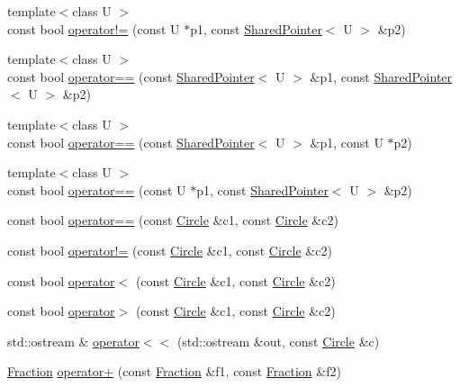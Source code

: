 \begin{DoxyCompactItemize}
\item 
{\footnotesize template$<$class U $>$ }\\const bool \hyperlink{namespaceprism_ab8792dbd5cac5678390843bacdb69daa}{operator!=} (const U $\ast$p1, const \hyperlink{classprism_1_1_shared_pointer}{Shared\+Pointer}$<$ U $>$ \&p2)
\item 
{\footnotesize template$<$class U $>$ }\\const bool \hyperlink{namespaceprism_ae53d52e8a36ec7ca58ea1731cc18f1d8}{operator==} (const \hyperlink{classprism_1_1_shared_pointer}{Shared\+Pointer}$<$ U $>$ \&p1, const \hyperlink{classprism_1_1_shared_pointer}{Shared\+Pointer}$<$ U $>$ \&p2)
\item 
{\footnotesize template$<$class U $>$ }\\const bool \hyperlink{namespaceprism_a2b73e87f080646696ed6b595a3900119}{operator==} (const \hyperlink{classprism_1_1_shared_pointer}{Shared\+Pointer}$<$ U $>$ \&p1, const U $\ast$p2)
\item 
{\footnotesize template$<$class U $>$ }\\const bool \hyperlink{namespaceprism_a1f29b22985dc0ec1fc548a551ce313ed}{operator==} (const U $\ast$p1, const \hyperlink{classprism_1_1_shared_pointer}{Shared\+Pointer}$<$ U $>$ \&p2)
\item 
const bool \hyperlink{namespaceprism_a0ce1ad6e6392618212d5ab3bebb8e585}{operator==} (const \hyperlink{classprism_1_1_circle}{Circle} \&c1, const \hyperlink{classprism_1_1_circle}{Circle} \&c2)
\item 
const bool \hyperlink{namespaceprism_a58cbf7ef406800002b446a0f1e917745}{operator!=} (const \hyperlink{classprism_1_1_circle}{Circle} \&c1, const \hyperlink{classprism_1_1_circle}{Circle} \&c2)
\item 
const bool \hyperlink{namespaceprism_a8e662d15b162ca76912c491798caefd3}{operator$<$} (const \hyperlink{classprism_1_1_circle}{Circle} \&c1, const \hyperlink{classprism_1_1_circle}{Circle} \&c2)
\item 
const bool \hyperlink{namespaceprism_a671739ac8567654dba563c34af92213f}{operator$>$} (const \hyperlink{classprism_1_1_circle}{Circle} \&c1, const \hyperlink{classprism_1_1_circle}{Circle} \&c2)
\item 
std\+::ostream \& \hyperlink{namespaceprism_aa63d3d39d3fad8fa5c5966cc4f306324}{operator$<$$<$} (std\+::ostream \&out, const \hyperlink{classprism_1_1_circle}{Circle} \&c)
\item 
\hyperlink{classprism_1_1_fraction}{Fraction} \hyperlink{namespaceprism_ac1b5b2765c314b2baa2dba5c57419829}{operator+} (const \hyperlink{classprism_1_1_fraction}{Fraction} \&f1, const \hyperlink{classprism_1_1_fraction}{Fraction} \&f2)

\end{DoxyCompactItemize}
